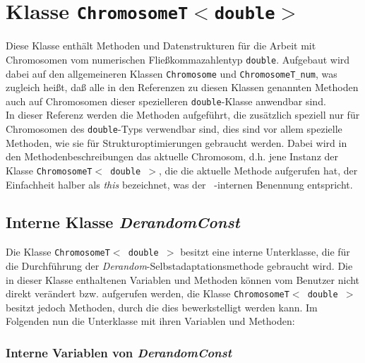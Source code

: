 \documentclass{report}
\begin{document}
\newpage

\setNormalInstance

\noindent
\chapter{Klasse {\tt ChromosomeT$<$double$>$}}
Diese Klasse enth\"alt Methoden und Datenstrukturen f\"ur die Arbeit
mit Chromosomen vom numerischen Flie{\ss}kommazahlentyp {\tt double}.
Aufgebaut wird dabei auf den allgemeineren Klassen {\tt Chromosome}
und {\tt ChromosomeT\_num},
was zugleich hei{\ss}t, da{\ss} alle in den Referenzen zu diesen Klassen
genannten Methoden auch auf Chromosomen dieser spezielleren
{\tt double}-Klasse anwendbar sind.\\
In dieser Referenz werden die Methoden aufgef\"uhrt, die zus\"atzlich 
speziell nur f\"ur Chromosomen des {\tt double}-Typs verwendbar sind, dies
sind vor allem spezielle Methoden, wie sie f\"ur Strukturoptimierungen
gebraucht werden.
Dabei wird in den Methodenbeschreibungen das aktuelle Chromosom, d.h. jene 
Instanz der Klasse {\tt ChromosomeT$<$ double $>$}, die die aktuelle Methode 
aufgerufen hat, der Einfachheit halber als {\em this} bezeichnet, was der 
\cpp\ -internen Benennung entspricht.

\section{Interne Klasse {\em DerandomConst}}
Die Klasse {\tt ChromosomeT$<$ double $>$} besitzt eine interne Unterklasse,
die f\"ur die Durchf\"uhrung der {\em Derandom}-Selbstadaptationsmethode
gebraucht wird. Die in dieser Klasse enthaltenen Variablen und Methoden
k\"onnen vom Benutzer nicht direkt ver\"andert bzw. aufgerufen werden, die
Klasse {\tt ChromosomeT$<$ double $>$} besitzt jedoch Methoden, durch
die dies bewerkstelligt werden kann. Im Folgenden nun die Unterklasse mit
ihren Variablen und Methoden:

\subsection{Interne Variablen von {\em DerandomConst}}
\end{document}
